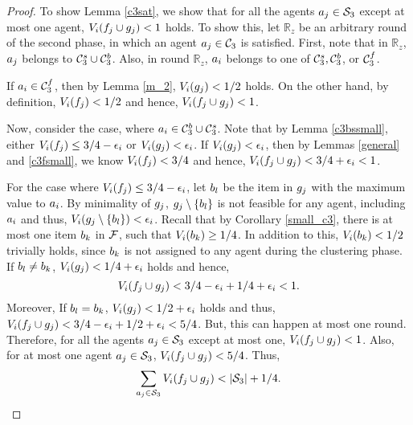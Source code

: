 \begin{proof}
To show Lemma \ref{c3sat}, we show that for all the agents $a_j \in \mathcal{S}_3$ except at most one agent, $V_i(f_j \cup g_j)<1$ holds. To show this, let ${\mathbb R}_z$ be an arbitrary round of the second phase, in which an agent $a_j \in \mathcal{C}_3$ is satisfied. First, note that in ${\mathbb R}_z$, $a_j$ belongs to $\mathcal{C}_3^s \cup \mathcal{C}_3^b$. Also, in round ${\mathbb R}_z$, $a_i$ belongs to one of $\mathcal{C}_3^s, \mathcal{C}_3^b$, or $\mathcal{C}_3^f$.  
 
If $a_i \in \mathcal{C}_3^f$, then by Lemma \ref{m_2}, $V_i(g_j)<1/2$ holds. On the other hand, by definition, $V_i(f_j)<1/2$ and hence, $V_i(f_j \cup g_j)<1$. 

Now, consider the case, where $a_i \in \mathcal{C}_3^b \cup \mathcal{C}_3^s$. Note that by Lemma \ref{c3bssmall}, either $V_i(f_j) \leq 3/4-\epsilon_i$ or $V_i(g_j) < \epsilon_i$. If $V_i(g_j) < \epsilon_i$, then by Lemmas \ref{general} and \ref{c3fsmall}, we know $V_i(f_j) < 3/4$ and hence, $V_i(f_j \cup g_j)<3/4 + \epsilon_i < 1$. 

For the case where $V_i(f_j) \leq 3/4-\epsilon_i$, let $b_l$ be the item in $g_j$ with the maximum value to $a_i$. By minimality of $g_j$, $g_j \setminus \{b_l\}$ is not feasible for any agent, including  $a_i$ and thus, $V_i(g_j\setminus \{b_l\}) < \epsilon_i$. Recall that by Corollary \ref{small_c3}, there is at most one item $b_k$ in $\mathcal{F}$, such that $V_i(b _k) \geq 1/4$. In addition to this, $V_i(b_k) < 1/2$ trivially holds, since $b_k$ is not assigned to any agent during the clustering phase. If $b_l \neq b_k$, $V_i(g_j)< 1/4 + \epsilon_i$ holds and hence, $$V_i(f_j \cup g_j) < 3/4-\epsilon_i + 1/4 + \epsilon_i<1.$$ Moreover, If $b_l = b_k$, $V_i(g_j)< 1/2 + \epsilon_i$ holds and thus, $V_i(f_j \cup g_j) < 3/4-\epsilon_i + 1/2 + \epsilon_i<5/4$. But, this can happen at most one round. Therefore, for all the agents $a_j \in \mathcal{S}_3$ except at most one, $V_i(f_j \cup g_j)<1$. Also, for at most one agent $a_j \in \mathcal{S}_3$, $V_i(f_j \cup g_j)<5/4$. Thus, 
$$\sum_{a_j \in \mathcal{S}_3} V_i(f_j \cup g_j)< |\mathcal{S}_3| + 1/4.$$   
\end{proof}



